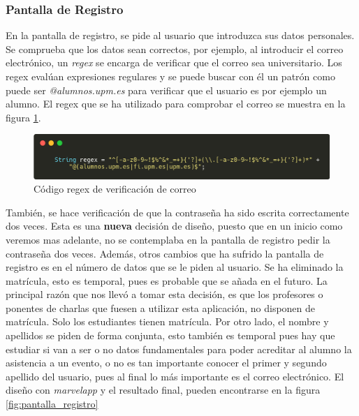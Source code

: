 \clearpage
\subsubsection{Pantalla de Registro}

En la pantalla de registro, se pide al usuario que introduzca sus datos personales. Se comprueba que los datos sean correctos, por ejemplo, al introducir el correo electrónico, un \textit{regex} se encarga de verificar que el correo sea universitario. Los regex evalúan expresiones regulares y se puede buscar con él un patrón como puede ser \textit{@alumnos.upm.es} para verificar que el usuario es por ejemplo un alumno. El regex que se ha utilizado para comprobar el correo se muestra en la figura \ref{fig:regex}. \\

\begin{figure}[h!]
  \centering
  \includegraphics[width=0.9\linewidth]{figs/Desarrollo/Codigo/regex}
  \caption[Código regex de verificación de correo]{Código regex de verificación de correo}
  \label{fig:regex}
\end{figure}

También, se hace verificación de que la contraseña ha sido escrita correctamente dos veces. Esta es una \textbf{nueva} decisión de diseño, puesto que en un inicio como veremos mas adelante, no se contemplaba en la pantalla de registro pedir la contraseña dos veces. Además, otros cambios que ha sufrido la pantalla de registro es en el número de datos que se le piden al usuario. Se ha eliminado la matrícula, esto es temporal, pues es probable que se añada en el futuro. La principal razón que nos llevó a tomar esta decisión, es que los profesores o ponentes de charlas que fuesen a utilizar esta aplicación, no disponen de matrícula. Solo los estudiantes tienen matrícula. Por otro lado, el nombre y apellidos se piden de forma conjunta, esto también es temporal pues hay que estudiar si van a ser o no datos fundamentales para poder acreditar al alumno la asistencia a un evento, o no es tan importante conocer el primer y segundo apellido del usuario, pues al final lo más importante es el correo electrónico. El diseño con \emph{marvelapp} y el resultado final, pueden encontrarse en la figura \ref{fig:pantalla_registro}

